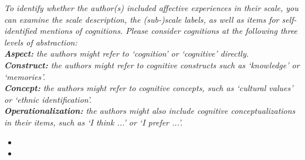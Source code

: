 \documentclass[10pt,a4paper]{protocol}
\begin{document}
\textit{To identify whether the author(s) included affective experiences in their scale, you can examine the scale description, the (sub-)scale labels, as well as items for self-identified mentions of cognitions. Please consider cognitions at the following three levels of abstraction:\\
\textbf{Aspect:} the authors might refer to `cognition' or `cognitive' directly.\\
\textbf{Construct:} the authors might refer to cognitive constructs such as `knowledge' or `memories'.\\
\textbf{Concept:} the authors might refer to cognitive concepts, such as `cultural values' or `ethnic identification'.\\
\textbf{Operationalization:} the authors might also include cognitive conceptualizations in their items, such as `I think ...' or `I prefer ...'.}
\vspace{0.5em}
\begin{itemize}
	\item {}
	\item {}
\end{itemize}
\divider

\end{document}
